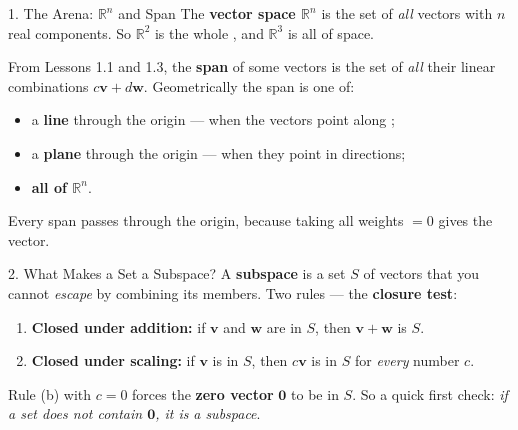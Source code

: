 \documentclass[10pt]{article}
\newcommand{\vv}{\mathbf{v}}
\newcommand{\ww}{\mathbf{w}}
\newcommand{\zero}{\mathbf{0}}
\begin{document}
\begin{notesbox}{1. The Arena: $\mathbb{R}^n$ and Span}
The \textbf{vector space $\mathbb{R}^n$} is the set of \emph{all} vectors with $n$ real
components. So $\mathbb{R}^2$ is the whole , and $\mathbb{R}^3$ is all of space.

\vspace{3pt}
From Lessons 1.1 and 1.3, the \textbf{span} of some vectors is the set of \emph{all} their linear
combinations $c\vv + d\ww$. Geometrically the span is one of:
\begin{itemize}[leftmargin=1.5em, itemsep=1pt]
  \item a \textbf{line} through the origin --- when the vectors point along ;
  \item a \textbf{plane} through the origin --- when they point in  directions;
  \item \textbf{all of $\mathbb{R}^n$}.
\end{itemize}
Every span passes through the origin, because taking all weights $=0$ gives the 
vector.
\end{notesbox}

\begin{notesbox}{2. What Makes a Set a Subspace?}
A \textbf{subspace} is a set $S$ of vectors that you cannot \emph{escape} by combining its
members. Two rules --- the \textbf{closure test}:
\begin{enumerate}[leftmargin=1.9em, itemsep=3pt]
  \item[\textbf{(a)}] \textbf{Closed under addition:} if $\vv$ and $\ww$ are in $S$, then
        $\vv+\ww$ is  $S$.
  \item[\textbf{(b)}] \textbf{Closed under scaling:} if $\vv$ is in $S$, then $c\vv$ is in $S$ for
        \emph{every} number $c$.
\end{enumerate}
Rule (b) with $c=0$ forces the \textbf{zero vector} $\zero$ to be in $S$. So a quick first check:
\emph{if a set does not contain $\zero$, it is}  \emph{a subspace}.
\end{notesbox}
\end{document}
